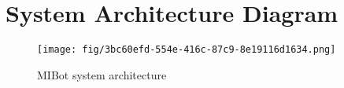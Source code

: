 \chapter{System Architecture Diagram}
\label{app:architecture-diagrams}

\begin{figure}[h!]
	\centering
	\texttt{[image: fig/3bc60efd-554e-416c-87c9-8e19116d1634.png]}
	\caption{MIBot system architecture}
	\label{fig:mibot-sys-arch}
\end{figure}